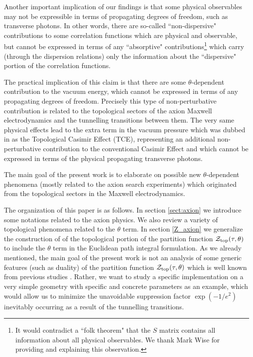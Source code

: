 \documentclass[ twocolumn,aps,prd,   
               preprintnumbers,numbers,sort&compress,nofootinbib,
                            showpacs,superscriptaddress,
               colorlinks,
               linkcolor=blue,   
               citecolor=blue]{revtex4-1}   \newcommand{\exclude}[1]{}
\begin{document}
  Another important implication of our findings is that some physical observables may not be expressible in terms of propagating degrees of freedom, such as transverse photons. In other words, there are so-called ``non-dispersive" contributions to some correlation functions which are physical and observable, but cannot be expressed in terms of any   ``absorptive" contributions\footnote{\label{folk_theorem}It would contradict a ``folk theorem" that the $S$ matrix contains all information about all physical observables. We thank Mark Wise for providing and explaining this observation.} which carry  (through the dispersion relations)   only  the information about the   ``dispersive" portion of the correlation functions.

 
    
  The practical implication of this claim is that  there are some $\theta$-dependent contribution to the vacuum energy, which cannot be expressed in terms of any propagating degrees of freedom.  Precisely this type of non-perturbative contribution is related to the topological sectors of the axion Maxwell electrodynamics and the tunnelling transitions between them.
   The very same physical effects lead to the extra term in the vacuum pressure which was dubbed in  \cite{Cao:2013na}  as the   Topological Casimir Effect (TCE), representing  an additional non-perturbative contribution to the conventional Casimir Effect \cite{Casimir} and which cannot be expressed in terms of the physical propagating transverse photons. 
  
  The main goal of the present work is to elaborate
  on possible new $\theta$-dependent phenomena (mostly related to the axion search experiments) which 
  originated from the topological sectors in the Maxwell electrodynamics.%
  
  The organization of this paper is as follows. In section \ref{sect:axion} we introduce some notations related to the axion physics.  We also   review a  variety of topological phenomena related to the $\theta$ term. In section \ref{Z_axion} we generalize 
  the construction of   \cite{Cao:2013na,Cao:2015uza}  of the topological portion of the partition function ${\cal{Z}}_{\rm top}(\tau, \theta ) $ to include the $\theta$ term in the Euclidean path integral formulation. As we already mentioned, the main goal of the present work    is not an analysis of some generic features (such as duality) of   
  the partition function ${\cal{Z}}_{\rm top}(\tau, \theta ) $ which is well known from previous studies \cite{Witten:1995gf,Verlinde:1995mz,Olive:2000yy}. Rather, we want to study a specific implementation on a very simple  geometry with specific and concrete parameters as an example, which would allow us to minimize the unavoidable    suppression factor  $\exp(-1/e^2)$   inevitably  occurring  as a result of the tunnelling transitions. 
  
\end{document}
